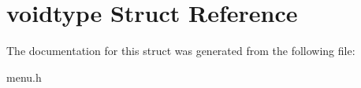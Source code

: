 \hypertarget{structvoidtype}{\section{voidtype Struct Reference}
\label{structvoidtype}
}


The documentation for this struct was generated from the following file\-:\begin{DoxyCompactItemize}
\item 
menu.\-h\end{DoxyCompactItemize}
